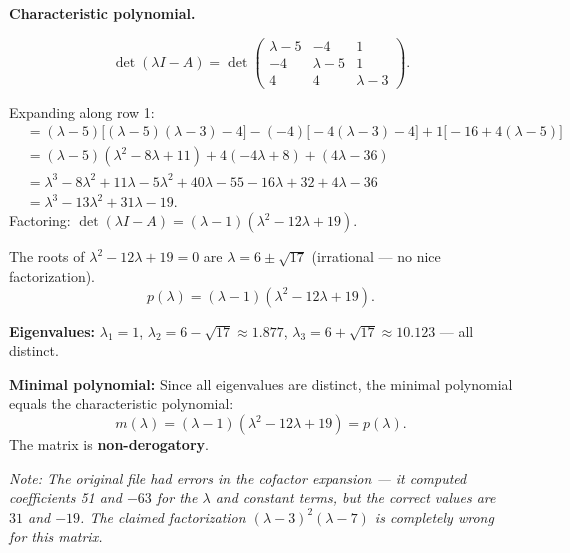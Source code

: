 \documentclass[12pt,a3paper]{article}
\begin{document}
\begin{tcolorbox}[enhanced,breakable,
  colback=cA!4,colframe=cA,boxrule=0.8pt,arc=5pt,
  title={\textbf{Answer --- Char.\ \& Minimal Poly of
    $A=\begin{pmatrix}5&4&-1\\4&5&-1\\-4&-4&3\end{pmatrix}$}},
  fonttitle=\bfseries\color{white},colbacktitle=cA]

\textbf{Characteristic polynomial.}

\[
  \det(\lambda I-A) = \det\begin{pmatrix}\lambda-5&-4&1\\-4&\lambda-5&1\\4&4&\lambda-3\end{pmatrix}.
\]

Expanding along row 1:
\begin{align*}
  &= (\lambda-5)\bigl[(\lambda-5)(\lambda-3)-4\bigr]
   -(-4)\bigl[-4(\lambda-3)-4\bigr]
   +1\bigl[-16+4(\lambda-5)\bigr]\\
  &= (\lambda-5)(\lambda^2-8\lambda+11)
   +4(-4\lambda+8)
   +(4\lambda-36)\\
  &= \lambda^3-8\lambda^2+11\lambda-5\lambda^2+40\lambda-55
   -16\lambda+32+4\lambda-36\\
  &= \lambda^3-13\lambda^2+31\lambda - 19.
\end{align*}
Factoring: $\det(\lambda I-A)=(\lambda-1)(\lambda^2-12\lambda+19)$.

The roots of $\lambda^2-12\lambda+19=0$ are $\lambda=6\pm\sqrt{17}$
(irrational — no nice factorization).
\[
  \boxed{p(\lambda)=(\lambda-1)(\lambda^2-12\lambda+19).}
\]

\textbf{Eigenvalues:} $\lambda_1=1$,\; $\lambda_2=6-\sqrt{17}\approx1.877$,\;
$\lambda_3=6+\sqrt{17}\approx10.123$ — all distinct.

\textbf{Minimal polynomial:} Since all eigenvalues are distinct, the minimal polynomial
equals the characteristic polynomial:
\[
  m(\lambda) = (\lambda-1)(\lambda^2-12\lambda+19) = p(\lambda).
\]
The matrix is \textbf{non-derogatory}.

\medskip
\textit{Note: The original file had errors in the cofactor expansion — it computed
coefficients 51 and $-63$ for the $\lambda$ and constant terms, but the
correct values are $31$ and $-19$. The claimed factorization $(λ-3)^2(λ-7)$ is
completely wrong for this matrix.}

\end{tcolorbox}
\end{document}

